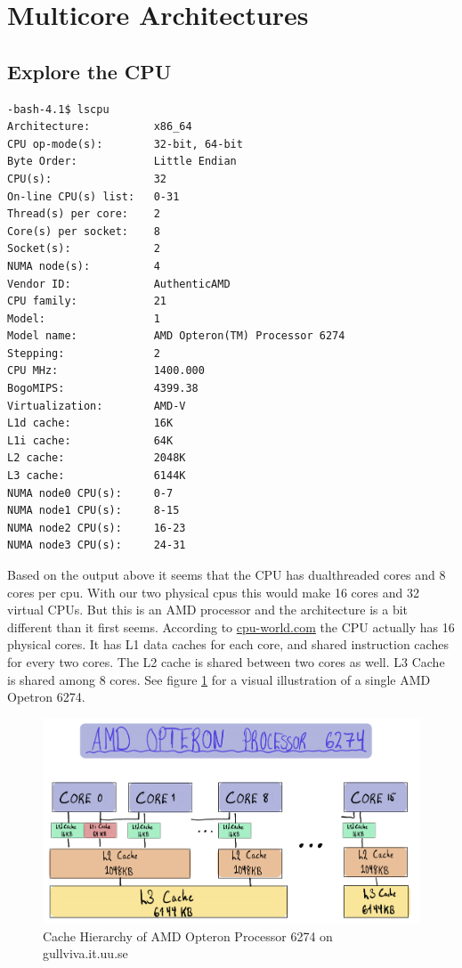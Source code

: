 \section{Multicore Architectures}

\subsection{Explore the CPU}

\begin{lstlisting}[caption=Output from lscpu command]
-bash-4.1$ lscpu
Architecture:          x86_64
CPU op-mode(s):        32-bit, 64-bit
Byte Order:            Little Endian
CPU(s):                32
On-line CPU(s) list:   0-31
Thread(s) per core:    2
Core(s) per socket:    8
Socket(s):             2
NUMA node(s):          4
Vendor ID:             AuthenticAMD
CPU family:            21
Model:                 1
Model name:            AMD Opteron(TM) Processor 6274
Stepping:              2
CPU MHz:               1400.000
BogoMIPS:              4399.38
Virtualization:        AMD-V
L1d cache:             16K
L1i cache:             64K
L2 cache:              2048K
L3 cache:              6144K
NUMA node0 CPU(s):     0-7
NUMA node1 CPU(s):     8-15
NUMA node2 CPU(s):     16-23
NUMA node3 CPU(s):     24-31
\end{lstlisting}

Based on the output above it seems that the CPU has dualthreaded cores and 8 
cores per cpu. With our two physical cpus this would make 16 cores and 32 virtual
CPUs. But this is an AMD processor and the architecture is a bit different than
it first seems. According to \href{https://www.cpu-world.com/CPUs/Bulldozer/AMD-Opteron%206274%20OS6274WKTGGGU.html}{cpu-world.com}
the CPU actually has 16 physical cores. It has L1 data caches for each core, and 
shared instruction caches for every two cores. The L2 cache is shared between 
two cores as well. L3 Cache is shared among 8 cores. See figure \ref{fig:amd}
for a visual illustration of a single AMD Opetron 6274.

\begin{figure}
    \centering
    \label{fig:amd}
    \includegraphics[width=\linewidth]{Figures/datahierarchy.PNG}
    \caption{Cache Hierarchy of AMD Opteron Processor 6274 on gullviva.it.uu.se}
\end{figure}


